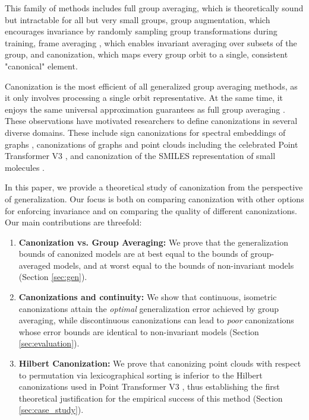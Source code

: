This family of methods includes full group averaging, which is theoretically sound but intractable for all but very small groups, group augmentation, which encourages invariance by randomly sampling group transformations during training, frame averaging \cite{punyframe}, which enables invariant averaging over subsets of the group, and canonization, which maps every group orbit to a single, consistent "canonical" element.


Canonization is the most efficient of all generalized group averaging methods, as it only involves processing a single orbit representative. At the same time, it enjoys the same universal approximation guarantees as full group averaging \cite{kaba2023equivariance}. These observations have motivated researchers to define canonizations in several diverse domains. These include sign canonizations for spectral embeddings of graphs \cite{ma2023laplacian,hordan2025spectral}, canonizations of graphs \cite{lin2024equivariance} and point clouds \cite{kaba2023equivariance,pmlr-v235-baker24a,friedmann2025,zhou2026rethinkingdiffusionmodelssymmetries} including the celebrated Point Transformer V3 \cite{wu2024ptv3}, and canonization of the SMILES representation of small molecules \cite{canonicalSMILES}.


In this paper, we provide a theoretical study of canonization from the perspective of generalization. Our focus is both on comparing canonization with other options for enforcing invariance and on comparing the quality of different canonizations. Our main  contributions are threefold:

\begin{enumerate}
\item \textbf{Canonization vs. Group Averaging:} We prove that the generalization bounds of canonized models are at best equal to the bounds of group-averaged models, and at worst equal to the bounds of non-invariant models (Section \ref{sec:gen}).

\item \textbf{Canonizations and continuity:} We show that continuous, isometric canonizations attain the \emph{optimal} generalization error achieved by group averaging, while discontinuous canonizations can lead to \emph{poor} canonizations whose error bounds are identical to non-invariant models (Section \ref{sec:evaluation}).

\item \textbf{Hilbert Canonization:} We prove that
canonizing point clouds with respect to permutation via lexicographical sorting is inferior to the  Hilbert canonizations used in  Point Transformer V3 \cite{wu2024ptv3}, thus establishing the first theoretical justification for the empirical success of this method (Section \ref{sec:case_study}).
\end{enumerate}


